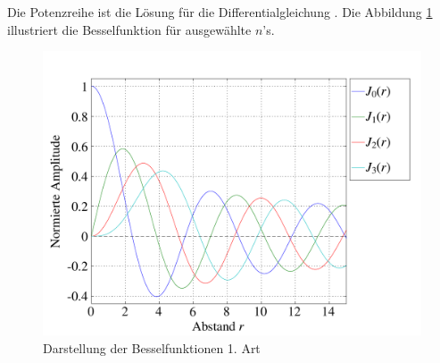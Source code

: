 \begin{normalsize}%
Die Potenzreihe  ist die L\"osung f\"ur die Differentialgleichung .
Die Abbildung \ref{img:besselfunction} illustriert die Besselfunktion  f\"ur ausgew\"ahlte $n$'s.
\end{normalsize}
\begin{figure}[h]
	\begin{center}
		\includegraphics[scale=0.5]{kreis/besselfunction.pdf}
		\caption[Besselfunktion 1. Art]{Darstellung der Besselfunktionen 1. Art}
		\label{img:besselfunction}
	\end{center}
\end{figure}
